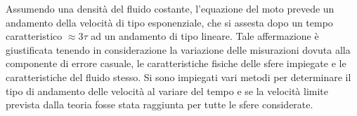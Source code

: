 \documentclass[a4paper,11pt,oneside]{article}
\begin{document}
\newpage

\begin{figure}
    \centering
    \label{fig:my_label}
\end{figure}


Assumendo una densità del fluido costante, l'equazione del moto prevede un andamento della velocità di tipo esponenziale, che si assesta dopo un tempo caratteristico $\approx 3\tau$ ad un andamento di tipo lineare. Tale affermazione è giustificata tenendo in considerazione la variazione delle misurazioni dovuta alla componente di errore casuale, le caratteristiche fisiche delle sfere impiegate e le caratteristiche del fluido stesso.\newline
Si sono impiegati vari metodi per determinare il tipo di andamento delle velocità al variare del tempo e se la velocità limite prevista dalla teoria fosse stata raggiunta per tutte le sfere considerate.
\end{document}
